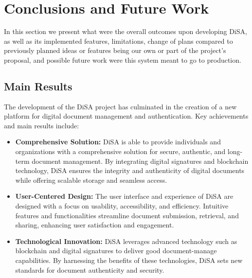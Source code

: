 \documentclass[a4paper,11pt]{article}
\begin{document}
    \clearpage
    \section{Conclusions and Future Work}\label{sec:conclusionsfuturework}
        \quad In this section we present what were the overall outcomes upon developing DiSA, as well as its implemented features, limitations, change of plans compared to previously planned ideas or features being our own or part of the project's proposal, and possible future work were this system meant to go to production.

        \subsection{Main Results}
            \quad The development of the DiSA project has culminated in the creation of a new platform for digital document management and authentication. Key achievements and main results include:
            \begin{itemize}
                \item \textbf{Comprehensive Solution:} DiSA is able to provide individuals and organizations with a comprehensive solution for secure, authentic, and long-term document management. By integrating digital signatures and blockchain technology, DiSA ensures the integrity and authenticity of digital documents while offering scalable storage and seamless access.
                \item \textbf{User-Centered Design:} The user interface and experience of DiSA are designed with a focus on usability, accessibility, and efficiency. Intuitive features and functionalities streamline document submission, retrieval, and sharing, enhancing user satisfaction and engagement.
                \item \textbf{Technological Innovation:} DiSA leverages advanced technology such as blockchain and digital signatures to deliver good document-manage capabilities. By harnessing the benefits of these technologies, DiSA sets new standards for document authenticity and security.
            \end{itemize}
\end{document}
